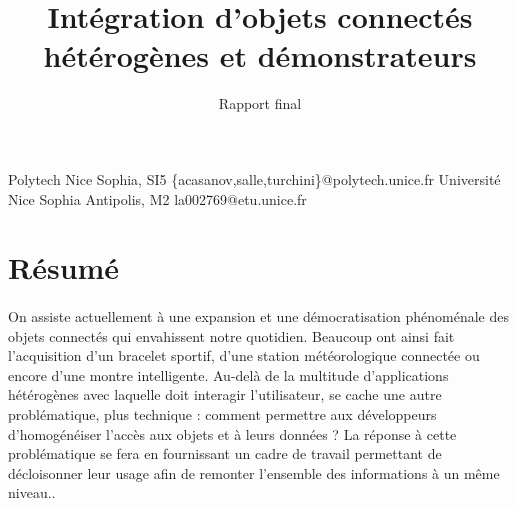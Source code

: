\documentclass[nocopyrightspace]{sigplanconf}
\begin{document}
\setlength{\pdfpageheight}{\paperheight}
\setlength{\pdfpagewidth}{\paperwidth}





\title{Intégration d’objets connectés hétérogènes et démonstrateurs}
\subtitle{Rapport final}

           {Polytech Nice Sophia, SI5}
           {\{acasanov,salle,turchini\}@polytech.unice.fr}
           {Université Nice Sophia Antipolis, M2}
           {la002769@etu.unice.fr}

\maketitle

\section*{Résumé}
	\paragraph{}
	On assiste actuellement à une expansion et une démocratisation phénoménale des objets connectés qui envahissent notre quotidien. Beaucoup ont ainsi fait l’acquisition d’un bracelet sportif, d’une station météorologique connectée ou encore d’une montre intelligente. Au-delà de la multitude d’applications hétérogènes avec laquelle doit interagir l’utilisateur, se cache une autre problématique, plus technique : comment permettre aux développeurs d’homogé\-néiser l’accès aux objets et à leurs données ? La réponse à cette problématique se fera en fournissant un cadre de travail permettant de décloisonner leur usage afin de remonter l’ensemble des informations à un même niveau..
\end{document}

